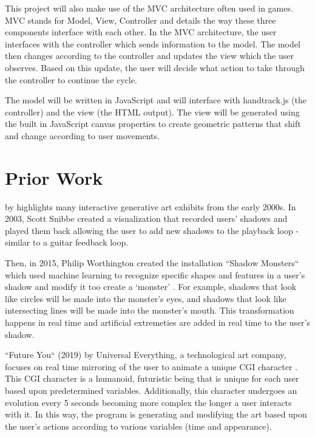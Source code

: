 \documentclass[10pt,twocolumn]{article}
\begin{document}
This project will also make use of the MVC architecture often used in games.  MVC stands for Model, View, Controller and details the way these three components interface with each other. In the MVC architecture, the user interfaces with the controller which sends information to the model.  The model then changes according to the controller and updates the view which the user observes.  Based on this update, the user will decide what action to take through the controller to continue the cycle. 

The model will be written in JavaScript and will interface with handtrack.js (the controller) and the view (the HTML output).  The view will be generated using the built in JavaScript canvas properties to create geometric patterns that shift and change according to user movements. 

\section{Prior Work}

 by \citeauthor{kwon_real-time_nodate} highlights many interactive generative art exhibits from the early 2000s. In 2003, Scott Snibbe created a visualization that recorded users' shadows and played them back allowing the user to add new shadows to the playback loop - similar to a guitar feedback loop.  

Then, in 2015, Philip Worthington created the installation ``Shadow Monsters`` which used machine learning to recognize specific shapes and features in a user's shadow and modify it too create a `monster' \cite{houston_public_media_mfah_2015}.  For example, shadows that look like circles will be made into the monster's eyes, and shadows that look like intersecting lines will be made into the monster's mouth.  This transformation happens in real time and artificial extremeties are added in real time to the user's shadow.

``Future You`` (2019) by Universal Everything, a technological art company, focuses on real time mirroring of the user to animate a unique CGI character \cite{noauthor_future_2019}. This CGI character is a humanoid, futuristic being that is unique for each user based upon predetermined variables. Additionally, this character undergoes an evolution every 5 seconds becoming more complex the longer a user interacts with it.  In this way, the program is generating and modifying the art based upon the user's actions according to various variables (time and appearance).  
\end{document}

